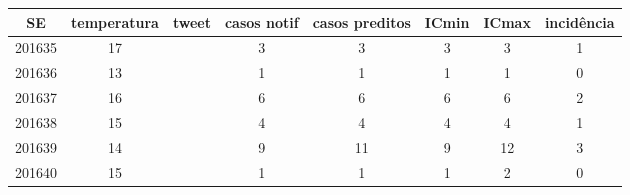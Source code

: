 \begin{tabular}{c|ccccccc}
  \hline
SE & temperatura & tweet & casos notif & casos preditos & ICmin & ICmax & incidência \\ 
  \hline
201635 & 17 &  & 3 & 3 & 3 & 3 & 1 \\ 
  201636 & 13 &  & 1 & 1 & 1 & 1 & 0 \\ 
  201637 & 16 &  & 6 & 6 & 6 & 6 & 2 \\ 
  201638 & 15 &  & 4 & 4 & 4 & 4 & 1 \\ 
  201639 & 14 &  & 9 & 11 & 9 & 12 & 3 \\ 
  201640 & 15 &  & 1 & 1 & 1 & 2 & 0 \\ 
   \hline
\end{tabular}
